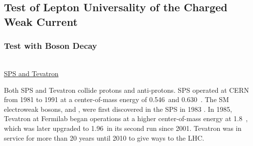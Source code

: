 \subsection{Test of Lepton Universality of the Charged Weak Current}
\label{sec:relatedWorks:lu}


\subsubsection{Test with \PW Boson Decay} 
\label{sec:relatedWorks:lu:W}

~\\




\underline{SPS and Tevatron}

Both SPS and Tevatron collide protons and anti-protons. SPS operated at CERN from 1981 to 1991 at a center-of-mass energy of 0.546~\TeV and 0.630~\TeV. The SM electroweak bosons, \PW and \PZ, were first discovered in the SPS in 1983 \cite{ARNISON1983103, BANNER1983476}. In 1985, Tevatron at Fermilab began operations at a higher center-of-mass energy at 1.8~\TeV, which was later upgraded to 1.96~\TeV in its second run since 2001. Tevatron was in service for more than 20 years until 2010 to give ways to the LHC. 


